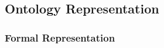 


\subsection{Ontology Representation}
\label{subsec:ontology-representation}


\subsubsection{Formal Representation}
\label{subsubsec:formal-representation}


